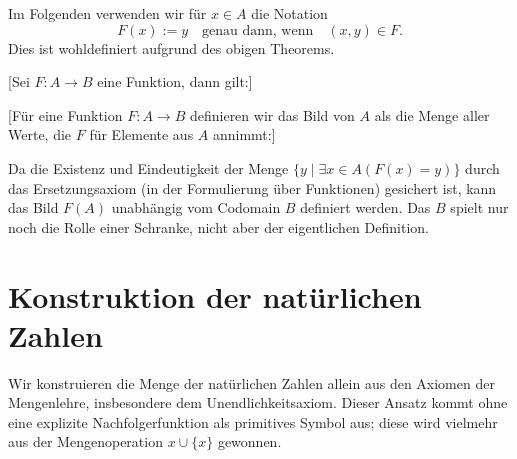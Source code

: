 \documentclass[main.tex]{subfiles}
\begin{document}
\begin{remark}
Im Folgenden verwenden wir für \(x \in A\) die Notation
\[
F(x) := y \quad\text{genau dann, wenn}\quad (x,y)\in F.
\]
Dies ist wohldefiniert aufgrund des obigen Theorems.
\end{remark}

[Sei \(F\colon A\to B\) eine Funktion, dann gilt:]

\begin{tabproof}
\end{tabproof}

%
[Für eine Funktion \(F:A\to B\) definieren wir das Bild von \(A\) als die Menge aller Werte, 
die \(F\) für Elemente aus \(A\) annimmt:]

\begin{remark}
Da die Existenz und Eindeutigkeit der Menge 
\(\{y \mid \exists x \in A(F(x)=y)\}\) durch das 
Ersetzungsaxiom (in der Formulierung über Funktionen) gesichert ist, 
kann das Bild \(F(A)\) unabhängig vom Codomain \(B\) definiert werden. 
Das \(B\) spielt nur noch die Rolle einer Schranke, nicht aber der eigentlichen Definition.
\end{remark}

\chapter{Konstruktion der natürlichen Zahlen}

Wir konstruieren die Menge der natürlichen Zahlen allein aus den Axiomen der Mengenlehre, insbesondere dem Unendlichkeitsaxiom.  Dieser Ansatz kommt ohne eine explizite Nachfolgerfunktion als primitives Symbol aus; diese wird vielmehr aus der Mengenoperation \(x \cup \{x\}\) gewonnen.
\end{document}
